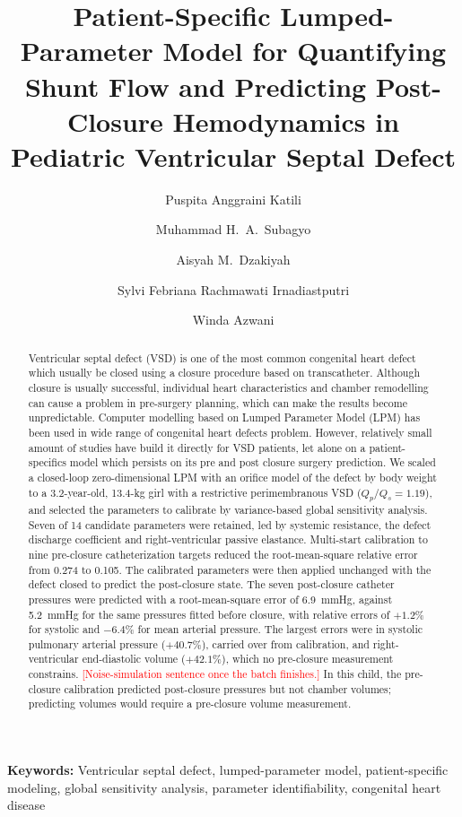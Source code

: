 \documentclass{article}
\title{Patient-Specific Lumped-Parameter Model for Quantifying Shunt Flow and Predicting Post-Closure Hemodynamics in Pediatric Ventricular Septal Defect}
\author{%
  Puspita Anggraini Katili\affilmark{1,*} \and
  Muhammad H.~A.~Subagyo\affilmark{1} \and
  Aisyah M.~Dzakiyah\affilmark{1} \and
  Sylvi Febriana Rachmawati Irnadiastputri\affilmark{1} \and
  Winda Azwani\affilmark{2}%
}
\newcommand{\pending}[1]{\textcolor{red}{[#1]}}
\begin{document}
\maketitle

\begin{abstract}
Ventricular septal defect (VSD) is one of the most common congenital heart defect which usually be closed using a closure procedure based on transcatheter. Although closure is usually successful, individual heart characteristics and chamber remodelling can cause a problem in pre-surgery planning, which can make the results become unpredictable. Computer modelling based on Lumped Parameter Model (LPM) has been used in wide range of congenital heart defects problem. However, relatively small amount of studies have build it directly for VSD patients, let alone on a patient-specifics model which persists on its pre and post closure surgery prediction. We scaled a closed-loop zero-dimensional LPM with an orifice model of the defect by body weight to a 3.2-year-old, 13.4-kg girl with a restrictive perimembranous VSD ($Q_p/Q_s = 1.19$), and selected the parameters to calibrate by variance-based global sensitivity analysis. Seven of 14 candidate parameters were retained, led by systemic resistance, the defect discharge coefficient and right-ventricular passive elastance. Multi-start calibration to nine pre-closure catheterization targets reduced the root-mean-square relative error from 0.274 to 0.105. The calibrated parameters were then applied unchanged with the defect closed to predict the post-closure state. The seven post-closure catheter pressures were predicted with a root-mean-square error of 6.9~mmHg, against 5.2~mmHg for the same pressures fitted before closure, with relative errors of $+1.2\%$ for systolic and $-6.4\%$ for mean arterial pressure. The largest errors were in systolic pulmonary arterial pressure ($+40.7\%$), carried over from calibration, and right-ventricular end-diastolic volume ($+42.1\%$), which no pre-closure measurement constrains. \pending{Noise-simulation sentence once the batch finishes.} In this child, the pre-closure calibration predicted post-closure pressures but not chamber volumes; predicting volumes would require a pre-closure volume measurement.
\end{abstract}

\noindent\textbf{Keywords:} Ventricular septal defect, lumped-parameter model, patient-specific modeling, global sensitivity analysis, parameter identifiability, congenital heart disease
\end{document}
